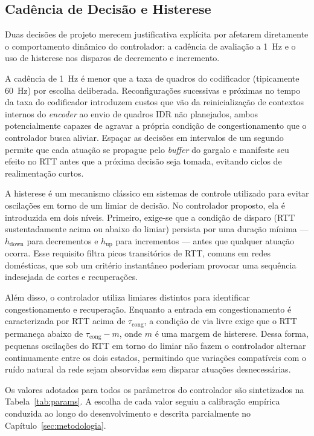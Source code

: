 \subsection{Cadência de Decisão e Histerese}

Duas decisões de projeto merecem justificativa explícita por
afetarem diretamente o comportamento dinâmico do controlador: a
cadência de avaliação a 1~Hz e o uso de histerese nos disparos
de decremento e incremento.

A cadência de 1~Hz é menor que a taxa de quadros do codificador
(tipicamente 60~Hz) por escolha deliberada. Reconfigurações
sucessivas e próximas no tempo da taxa do codificador
introduzem custos que vão da reinicialização de contextos
internos do \emph{encoder} ao envio de quadros IDR não
planejados, ambos potencialmente capazes de agravar a própria
condição de congestionamento que o controlador busca aliviar.
Espaçar as decisões em intervalos de um segundo permite que
cada atuação se propague pelo \emph{buffer} do gargalo e
manifeste seu efeito no RTT antes que a próxima decisão seja
tomada, evitando ciclos de realimentação curtos.

A histerese é um mecanismo clássico em sistemas de controle utilizado para evitar oscilações em torno de um limiar de decisão. No controlador proposto, ela é introduzida em dois níveis. Primeiro, exige-se que a condição de disparo (RTT sustentadamente acima ou abaixo do limiar) persista por uma duração mínima --- $h_{\text{down}}$ para decrementos e $h_{\text{up}}$ para incrementos --- antes que qualquer atuação ocorra. Esse requisito filtra picos transitórios de RTT, comuns em redes domésticas, que sob um critério instantâneo poderiam provocar uma sequência indesejada de cortes e recuperações.

Além disso, o controlador utiliza limiares distintos para identificar congestionamento e recuperação. Enquanto a entrada em congestionamento é caracterizada por RTT acima de $\tau_{\text{cong}}$, a condição de via livre exige que o RTT permaneça abaixo de $\tau_{\text{cong}}-m$, onde $m$ é uma margem de histerese. Dessa forma, pequenas oscilações do RTT em torno do limiar não fazem o controlador alternar continuamente entre os dois estados, permitindo que variações compatíveis com o ruído natural da rede sejam absorvidas sem disparar atuações desnecessárias.


Os valores adotados para todos os parâmetros do controlador são
sintetizados na Tabela~\ref{tab:params}. A escolha de cada
valor seguiu a calibração empírica conduzida ao longo do
desenvolvimento e descrita parcialmente no
Capítulo~\ref{sec:metodologia}.

